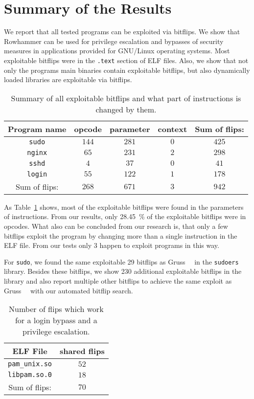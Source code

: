 \section{Summary of the Results}

We report that all tested programs can be exploited via bitflips. We show that
Rowhammer can be used for privilege escalation and bypasses of security measures
in applications provided for GNU/Linux operating systems. Most exploitable
bitflips were in the \texttt{.text} section of ELF files. Also, we show that not
only the program\textquotesingle s main binaries contain exploitable bitflips,
but also dynamically loaded libraries are exploitable via bitflips.

\begin{table}[!htb]
\centering
\begin{tabular}{c|ccc|c}
Program name & opcode & parameter & context & Sum of flips: \\ \hline
\texttt{sudo}  & $144$ & $281$ & $0$ & $425$ \\
\texttt{nginx} & $65$  & $231$ & $2$ & $298$ \\
\texttt{sshd}  & $4$   & $37$  & $0$ & $41$  \\
\texttt{login} & $55$  & $122$ & $1$ & $178$ \\ \hline
Sum of flips:  & $268$ & $671$ & $3$ & $942$
\end{tabular}
\caption{Summary of all exploitable bitflips and what part of instructions is
changed by them.}
\label{tab:summaryflips}
\end{table}

As Table~\ref{tab:summaryflips} shows, most of the exploitable bitflips were
found in the parameters of instructions. From our results, only
\SI{28.45}{\percent} of the exploitable bitflips were in opcodes. What also can
be concluded from our research is, that only a few bitflips exploit the
program by changing more than a single instruction in the ELF file. From
our tests only \num{3} happen to exploit programs in this way.

For \texttt{sudo}, we found the same exploitable \num{29} bitflips as
Gruss~\etal~\cite{flipinthewall} in the \texttt{sudoers} library. Besides these
bitflips, we show \num{230} additional exploitable bitflips in the library and
also report multiple other bitflips to achieve the same exploit as
Gruss~\etal~\cite{flipinthewall} with our automated bitflip search.

\begin{table}
\centering
\begin{tabular}{c|c}
ELF File & shared flips      \\ \hline
\texttt{pam\_unix.so} & $52$ \\
\texttt{libpam.so.0}  & $18$ \\ \hline
Sum of flips:         & $70$
\end{tabular}
\caption{Number of flips which work for a login bypass and a 
privilege escalation.}
\label{tab:loginsudo}
\end{table}

